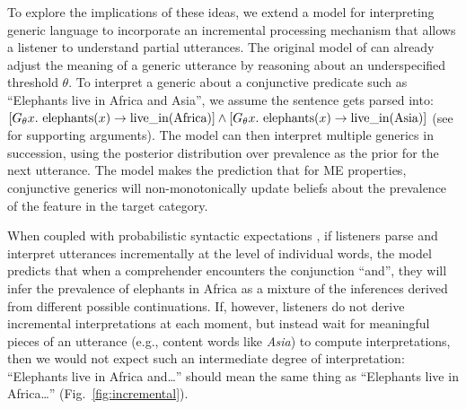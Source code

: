 \documentclass[letterpaper, 12pt]{article}
\begin{document}
To explore the implications of these ideas, we extend a model for interpreting generic language to incorporate an incremental processing mechanism that allows a listener to understand partial utterances.
The original model of  can already adjust the meaning of a generic utterance by reasoning about an underspecified threshold $\theta$.
To interpret a generic about a conjunctive predicate such as ``Elephants live in Africa and Asia'', we assume the sentence gets parsed into: $[G_\theta x. \textnormal{ elephants}(x) \to \textnormal{live\_in}(\textnormal{Africa})] \land [G_\theta x. \textnormal{ elephants}(x) \to \textnormal{live\_in}(\textnormal{Asia})]$ (see  for supporting arguments).
The model can then interpret multiple generics in succession, using the posterior distribution over prevalence as the prior for the next utterance. 
The model makes the prediction that for ME properties, conjunctive generics will non-monotonically update beliefs about the prevalence of the feature in the target category. 

When coupled with probabilistic syntactic expectations \cite{Levy2008}, if listeners parse and interpret utterances incrementally at the level of individual words, the model predicts that when a comprehender encounters the conjunction ``and'', they will infer the prevalence of elephants in Africa as a mixture of the inferences derived from different possible continuations.
If, however, listeners do not derive incremental interpretations at each moment, but instead wait for meaningful pieces of an utterance (e.g., content words like \emph{Asia}) to compute interpretations, then we would not expect such an intermediate degree of interpretation: ``Elephants live in Africa and\ldots'' should mean the same thing as ``Elephants live in Africa\ldots'' (Fig.~\ref{fig:incremental}). 

\end{document}
